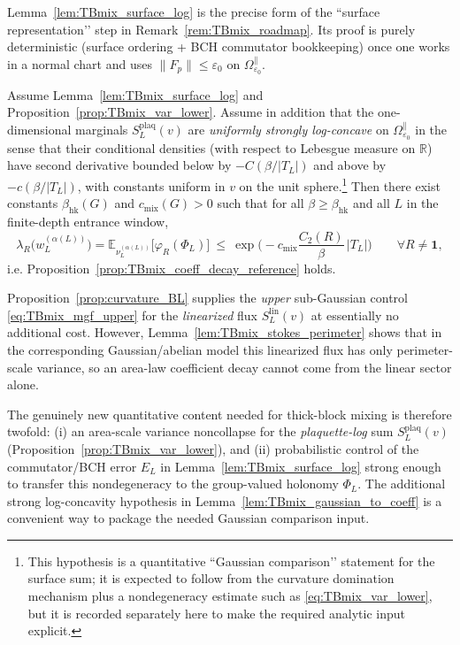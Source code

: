 \begin{remark}
Lemma~\ref{lem:TBmix_surface_log} is the precise form of the “surface representation’’ step in Remark~\ref{rem:TBmix_roadmap}.
Its proof is purely deterministic (surface ordering + BCH commutator bookkeeping) once one works in a normal chart
and uses $\|F_p\|\le \varepsilon_0$ on $\Omega_{\varepsilon_0}^{\parallel}$.
\end{remark}

\begin{lemma}\label{lem:TBmix_gaussian_to_coeff}
Assume Lemma~\ref{lem:TBmix_surface_log} and Proposition~\ref{prop:TBmix_var_lower}.
Assume in addition that the one-dimensional marginals $S_L^{\mathrm{plaq}}(v)$ are \emph{uniformly strongly log-concave} on $\Omega_{\varepsilon_0}^{\parallel}$ in the sense that
their conditional densities (with respect to Lebesgue measure on $\mathbb R$) have second derivative bounded below by
$-C(\beta/|T_L|)$ and above by $-c(\beta/|T_L|)$, with constants uniform in $v$ on the unit sphere.\footnote{This hypothesis is a quantitative
“Gaussian comparison’’ statement for the surface sum; it is expected to follow from the curvature domination mechanism plus a nondegeneracy
estimate such as \eqref{eq:TBmix_var_lower}, but it is recorded separately here to make the required analytic input explicit.}
Then there exist constants $\beta_{\mathrm{hk}}(G)$ and $c_{\mathrm{mix}}(G)>0$ such that for all $\beta\ge\beta_{\mathrm{hk}}$ and all $L$
in the finite-depth entrance window,
\[
\lambda_R\!\bigl(w_L^{(\alpha(L))}\bigr)
=\mathbb E_{\nu_L^{(\alpha(L))}}\!\big[\varphi_R(\Phi_L)\big]
\ \le\
\exp\!\Big(-c_{\mathrm{mix}}\frac{C_2(R)}{\beta}\,|T_L|\Big)
\qquad\forall R\neq\mathbf 1,
\]
i.e. Proposition~\ref{prop:TBmix_coeff_decay_reference} holds.
\end{lemma}

\begin{remark}
Proposition~\ref{prop:curvature_BL} supplies the \emph{upper} sub-Gaussian control \eqref{eq:TBmix_mgf_upper} for the \emph{linearized} flux
$S_L^{\mathrm{lin}}(v)$ at essentially no additional cost.
However, Lemma~\ref{lem:TBmix_stokes_perimeter} shows that in the corresponding Gaussian/abelian model this linearized flux has only
perimeter-scale variance, so an area-law coefficient decay cannot come from the linear sector alone.

The genuinely new quantitative content needed for thick-block mixing is therefore twofold:
(i) an area-scale variance noncollapse for the \emph{plaquette-log} sum $S_L^{\mathrm{plaq}}(v)$ (Proposition~\ref{prop:TBmix_var_lower}),
and (ii) probabilistic control of the commutator/BCH error $E_L$ in Lemma~\ref{lem:TBmix_surface_log} strong enough to transfer this
nondegeneracy to the group-valued holonomy $\Phi_L$.
The additional strong log-concavity hypothesis in Lemma~\ref{lem:TBmix_gaussian_to_coeff} is a convenient way to package the needed
Gaussian comparison input.
\end{remark}

